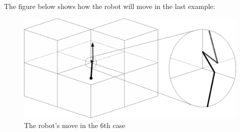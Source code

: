 \begin{problem}
\newpage

The figure below shows how the robot will move in the last example:

\begin{figure}[htbp]
\vspace{+\baselineskip}
\begin{center}
\includegraphics[scale=.5]{j6.eps}
\end{center}
\vspace{-\baselineskip}
\caption{The robot's move in the 6th case}
\end{figure}

\end{problem}

